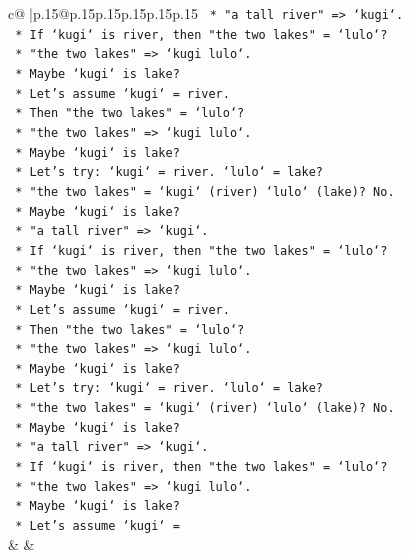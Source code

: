 \documentclass{article}
\begin{document}
{\begin{supertabular}{c@{$\;$}|p{.15\linewidth}@{}p{.15\linewidth}p{.15\linewidth}p{.15\linewidth}p{.15\linewidth}p{.15\linewidth}}
{{{\texttt{                    *   "a tall river" => `kugi`.} \\
\texttt{                    *   If `kugi` is river, then "the two lakes" = `lulo`?} \\
\texttt{                    *   "the two lakes" => `kugi lulo`.} \\
\texttt{                    *   Maybe `kugi` is lake?} \\
\texttt{                    *   Let's assume `kugi` = river.} \\
\texttt{                    *   Then "the two lakes" = `lulo`?} \\
\texttt{                    *   "the two lakes" => `kugi lulo`.} \\
\texttt{                    *   Maybe `kugi` is lake?} \\
\texttt{                    *   Let's try: `kugi` = river. `lulo` = lake?} \\
\texttt{                    *   "the two lakes" = `kugi` (river) `lulo` (lake)? No.} \\
\texttt{                    *   Maybe `kugi` is lake?} \\
\texttt{                    *   "a tall river" => `kugi`.} \\
\texttt{                    *   If `kugi` is river, then "the two lakes" = `lulo`?} \\
\texttt{                    *   "the two lakes" => `kugi lulo`.} \\
\texttt{                    *   Maybe `kugi` is lake?} \\
\texttt{                    *   Let's assume `kugi` = river.} \\
\texttt{                    *   Then "the two lakes" = `lulo`?} \\
\texttt{                    *   "the two lakes" => `kugi lulo`.} \\
\texttt{                    *   Maybe `kugi` is lake?} \\
\texttt{                    *   Let's try: `kugi` = river. `lulo` = lake?} \\
\texttt{                    *   "the two lakes" = `kugi` (river) `lulo` (lake)? No.} \\
\texttt{                    *   Maybe `kugi` is lake?} \\
\texttt{                    *   "a tall river" => `kugi`.} \\
\texttt{                    *   If `kugi` is river, then "the two lakes" = `lulo`?} \\
\texttt{                    *   "the two lakes" => `kugi lulo`.} \\
\texttt{                    *   Maybe `kugi` is lake?} \\
\texttt{                    *   Let's assume `kugi` =} \\
            }
        }
    }
    & & \\ \\


\end{supertabular}}
\end{document}
